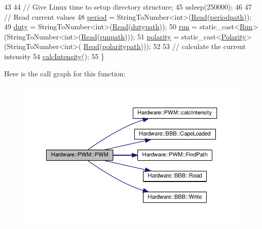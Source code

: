 \begin{DoxyCode}
43 
44         \textcolor{comment}{// Give Linux time to setup directory structure;}
45         usleep(250000);
46 
47         \textcolor{comment}{// Read current values}
48         \hyperlink{class_hardware_1_1_p_w_m_a91323a511e37d396f46d08f4159ef761}{period} = StringToNumber<int>(\hyperlink{class_hardware_1_1_b_b_b_a8b287ded7bcb2cfab361d1fca2b62e9f}{Read}(\hyperlink{class_hardware_1_1_p_w_m_a27e17a6c2e9720c571d5939f1a9ffb12}{periodpath}));
49         \hyperlink{class_hardware_1_1_p_w_m_a3309b2645c4c817384d91f33f0df5d64}{duty} = StringToNumber<int>(\hyperlink{class_hardware_1_1_b_b_b_a8b287ded7bcb2cfab361d1fca2b62e9f}{Read}(\hyperlink{class_hardware_1_1_p_w_m_a53311e9df6960751465d5f0b81192226}{dutypath}));
50         \hyperlink{class_hardware_1_1_p_w_m_a04531646b41accced24d46046c4bc7de}{run} = \textcolor{keyword}{static\_cast<}\hyperlink{class_hardware_1_1_p_w_m_a6f1e614731154a3613c03a4238ddd107}{Run}\textcolor{keyword}{>}(StringToNumber<int>(\hyperlink{class_hardware_1_1_b_b_b_a8b287ded7bcb2cfab361d1fca2b62e9f}{Read}(\hyperlink{class_hardware_1_1_p_w_m_ac1eb93467481ee2bd3565f1be47b8a01}{runpath})));
51         \hyperlink{class_hardware_1_1_p_w_m_ad346586d086f8462c3de6a4c19edb1d3}{polarity} = \textcolor{keyword}{static\_cast<}\hyperlink{class_hardware_1_1_p_w_m_a728111433109229b4da1efc953a107c1}{Polarity}\textcolor{keyword}{>}(StringToNumber<int>(
      \hyperlink{class_hardware_1_1_b_b_b_a8b287ded7bcb2cfab361d1fca2b62e9f}{Read}(\hyperlink{class_hardware_1_1_p_w_m_ace89c96484ffa9d6c9f3a8067848bf51}{polaritypath})));
52 
53         \textcolor{comment}{// calculate the current intensity}
54         \hyperlink{class_hardware_1_1_p_w_m_a891abdbbd00aae4f0a4afdf0a9e3a160}{calcIntensity}();
55     \}
\end{DoxyCode}


Here is the call graph for this function\+:\nopagebreak
\begin{figure}[H]
\begin{center}
\leavevmode
\includegraphics[width=350pt]{class_hardware_1_1_p_w_m_ac5608137ddc798aa26c505ec6edb8458_cgraph}
\end{center}
\end{figure}


